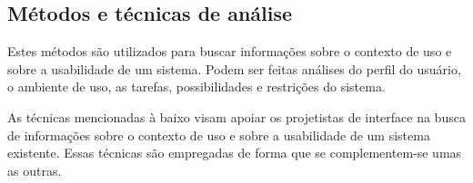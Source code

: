 
\subsection{Métodos e técnicas de análise}

Estes métodos são utilizados para buscar informações sobre o contexto de uso e sobre a usabilidade de um sistema. Podem ser feitas análises do perfil do usuário, o ambiente de uso, as tarefas, possibilidades e restrições do sistema.

As técnicas mencionadas à baixo visam apoiar os projetistas de interface na busca de informações sobre o contexto de uso e sobre a usabilidade de um sistema existente. Essas técnicas são empregadas de forma que se complementem-se umas as outras.

